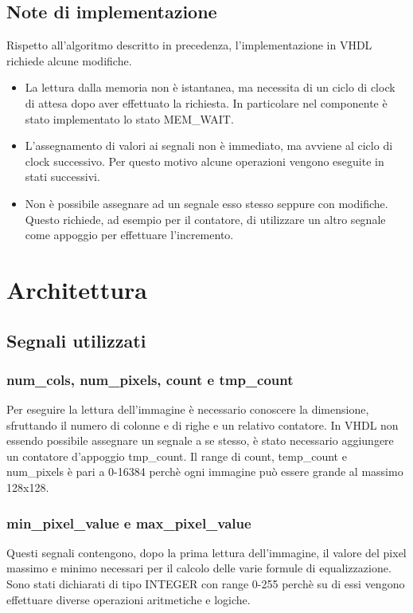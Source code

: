 \documentclass{article}
\begin{document}
\subsection{Note di implementazione}
Rispetto all'algoritmo descritto in precedenza, l'implementazione in VHDL richiede alcune modifiche.
\begin{itemize}
    \item La lettura dalla memoria non è istantanea, ma necessita di un ciclo di clock di attesa dopo aver effettuato la richiesta. In particolare nel componente è stato implementato lo stato MEM\_WAIT.
    \item L'assegnamento di valori ai segnali non è immediato, ma avviene al ciclo di clock successivo. Per questo motivo alcune operazioni vengono eseguite in stati successivi.
    \item Non è possibile assegnare ad un segnale esso stesso seppure con modifiche. Questo richiede, ad esempio per il contatore, di utilizzare un altro segnale come appoggio per effettuare l'incremento.
\end{itemize}

\pagebreak

\section{Architettura}
\subsection{Segnali utilizzati}

\subsubsection{num\_cols, num\_pixels, count e tmp\_count}
Per eseguire la lettura dell'immagine è necessario conoscere la dimensione, sfruttando il numero di colonne e di righe e un relativo contatore. In VHDL non essendo possibile assegnare un segnale a se stesso, è stato necessario aggiungere un contatore d'appoggio tmp\_count. Il range di count, temp\_count e num\_pixels è pari a 0-16384 perchè ogni immagine può essere grande al massimo 128x128.

\subsubsection{min\_pixel\_value e max\_pixel\_value}
Questi segnali contengono, dopo la prima lettura dell'immagine, il valore del pixel massimo e minimo necessari per il calcolo delle varie formule di equalizzazione. Sono stati dichiarati di tipo INTEGER con range 0-255 perchè su di essi vengono effettuare diverse operazioni aritmetiche e logiche.
\end{document}
